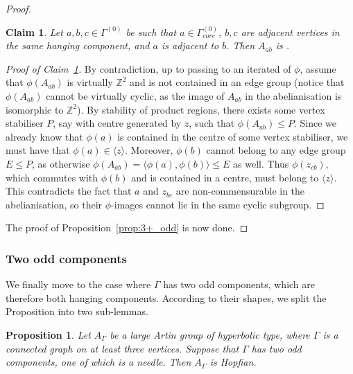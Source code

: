 \documentclass[svgnames]{amsart}
\theoremstyle{plain}
\newtheorem{prop}[thm]{Proposition}
\newtheorem{claim}[thm]{Claim}
\theoremstyle{definition}
\newenvironment{claimproof}{\renewcommand{\qedsymbol}{$\blacksquare$}\begin{proof}}{\end{proof}}
\newcommand{\Z}{\mathbb{Z}}
\begin{document}
\begin{proof}
\begin{claim}\label{claim:ponte_tibetano}
Let $a,b,c\in \Gamma^{(0)}$ be such that $a\in \Gamma_{core}^{(0)}$, $b,c$ are adjacent vertices in the same hanging component, and $a$ is adjacent to $b$. Then $A_{ab}$ is \good{}. 
\end{claim}

\begin{claimproof}[Proof of Claim~\ref{claim:ponte_tibetano}]
By contradiction, up to passing to an iterated of $\phi$, assume that $\phi(A_{ab})$ is virtually $\Z^2$ and is not contained in an edge group (notice that $\phi(A_{ab})$ cannot be virtually cyclic, as the image of $A_{ab}$ in the abelianisation is isomorphic to $\Z^2$). By stability of product regions, there exists some vertex stabiliser $P$, say with centre generated by $z$, such that $\phi(A_{ab})\le P$. Since we already know that $\phi(a)$ is contained in the centre of some vertex stabiliser, we must have that $\phi(a)\in \langle z\rangle$. Moreover, $\phi(b)$ cannot belong to any edge group $E\le P$, as otherwise $\phi(A_{ab})=\langle\phi(a),\phi(b)\rangle\le E$ as well. Thus $\phi(z_{cb})$, which commutes with $\phi(b)$ and is contained in a centre, must belong to $\langle z\rangle$. This contradicts the fact that $a$ and $z_{bc}$ are non-commensurable in the abelianisation, so their $\phi$-images cannot lie in the same cyclic subgroup.
\end{claimproof}
The proof of Proposition~\ref{prop:3+_odd} is now done.
\end{proof}



\subsubsection{Two odd components}
We finally move to the case where $\Gamma$ has two odd components, which are therefore both hanging components. According to their shapes, we split the Proposition into two sub-lemmas.
\begin{prop}\label{prop:2_odd_needle}
    Let $A_\Gamma$ be a large Artin group of hyperbolic type, where $\Gamma$ is a connected graph on at least three vertices. Suppose that $\Gamma$ has two odd components, one of which is a needle. Then $A_\Gamma$ is Hopfian.
\end{prop}
\end{document}
